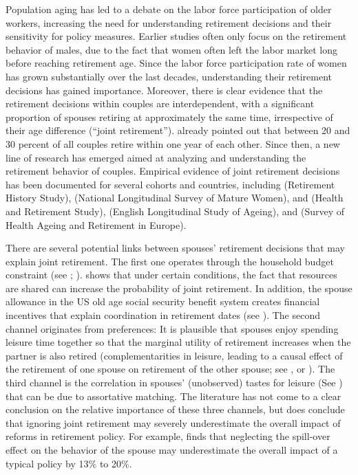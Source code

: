 \documentclass[11pt,letter]{article}
\begin{document}
\par Population aging has led to a debate on the labor force participation of older workers, increasing the need for understanding retirement decisions and their sensitivity for policy measures. Earlier studies often only focus on the retirement behavior of males, due to the fact that women often left the labor market long before reaching retirement age. Since the labor force participation rate of women has grown substantially over the last decades, understanding their retirement decisions has gained importance. Moreover, there is clear evidence that the retirement decisions within couples are interdependent, with a significant proportion of spouses retiring at approximately the same time, irrespective of their age difference (``joint retirement''). \cite{hurd1990} already pointed out that between 20 and 30 percent of all couples retire within one year of each other. Since then, a new line of research has emerged aimed at analyzing and understanding the retirement behavior of couples. Empirical evidence of joint retirement decisions has been documented for several cohorts and countries, including \citet{blau1998} (Retirement History Study), \citet{gustman2000retirement} (National Longitudinal Survey of Mature Women), \cite{gustman2004} and \cite{casanova2010} (Health and Retirement Study), \citet{banks2007dynamics} (English Longitudinal Study of Ageing), and \citet{Hospido2013} (Survey of Health Ageing and Retirement in Europe).

\par There are several potential links between spouses' retirement decisions that may explain joint retirement. The first one operates through the household budget constraint (see \citet{blau1998}; \citet{casanova2010}). \cite{casanova2010} shows that under certain conditions, the fact that resources are shared can increase the probability of joint retirement. In addition, the spouse allowance in the US old age social security benefit system creates financial incentives that explain coordination in retirement dates (see \citet{mccarty1990}). The second channel originates from  preferences: It is plausible that spouses enjoy spending leisure time together so that the marginal utility of retirement increases when the partner is also retired (complementarities in leisure, leading to a causal effect of the retirement of one spouse on retirement of the other spouse; see \citet{gustman2000retirement,gustman2004,gustman2009}, \citet{elena2016} or \citet{michaud2011}). The third channel is the correlation in spouses' (unobserved) tastes for leisure (See \citet{gustman2000retirement,gustman2004}) that can be due to assortative matching. The literature has not come to a clear conclusion on the relative importance of these three channels, but does conclude that ignoring joint retirement may severely underestimate the overall impact of reforms in retirement policy. For example, \citet{coile2004} finds that neglecting the spill-over effect on the behavior of the spouse may underestimate the overall impact of a typical policy by 13\% to 20\%.
\end{document}
